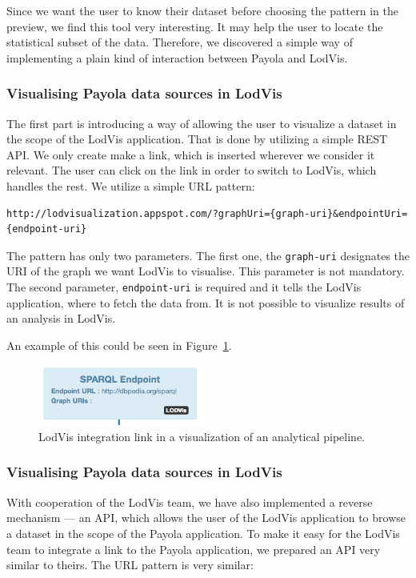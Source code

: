 Since we want the user to know their dataset before choosing the pattern in the 
preview, we find this tool very interesting. It may help the user to locate the 
statistical subset of the data. Therefore, we discovered a simple way of 
implementing a plain kind of interaction between Payola and LodVis.

\subsubsection{Visualising Payola data sources in LodVis}
The first part is introducing a way of allowing the user to visualize a 
dataset in the scope of the LodVis application. That is done by utilizing a 
simple REST API. We only create make a link, which is inserted wherever we consider it 
relevant. The user can click on the link in order to switch to LodVis,
which handles the rest. We utilize a simple URL pattern:

{  \scriptsize
\begin{verbatim}
http://lodvisualization.appspot.com/?graphUri={graph-uri}&endpointUri={endpoint-uri}
\end{verbatim}
}

The pattern has only two parameters. The first one, the \texttt{graph-uri} 
designates the URI of the graph we want LodVis to visualise. This parameter is 
not mandatory. The second parameter, \texttt{endpoint-uri} is required and it 
tells the LodVis application, where to fetch the data from. It is not possible 
to visualize results of an analysis in LodVis.

An example of this could be seen in Figure~\ref{fig:lodvis-int}.

\begin{figure}
	\centering
	\includegraphics[width=55mm]{img/lodvis-int.png}
	\caption{LodVis integration link in a visualization of an analytical pipeline.}
	\label{fig:lodvis-int}
\end{figure}


\subsubsection{Visualising Payola data sources in LodVis}
With cooperation of the LodVis team, we have also implemented a reverse 
mechanism --- an API, which allows the user of the LodVis application to browse a 
dataset in the scope of the Payola application. To make it easy for the LodVis 
team to integrate a link to the Payola application, we prepared an API very 
similar to theirs. The URL pattern is very similar:

